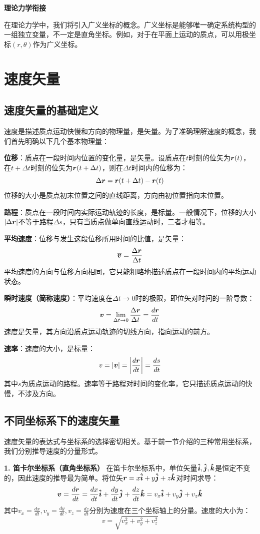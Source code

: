 \textbf{理论力学衔接}

在理论力学中，我们将引入广义坐标的概念。广义坐标是能够唯一确定系统构型的一组独立变量，不一定是直角坐标。例如，对于在平面上运动的质点，可以用极坐标$(r,\theta)$作为广义坐标。

\newpage

\section{速度矢量}

\subsection{速度矢量的基础定义}
速度是描述质点运动快慢和方向的物理量，是矢量。为了准确理解速度的概念，我们首先明确以下几个基本物理量：

\textbf{位移}：质点在一段时间内位置的变化量，是矢量。设质点在$t$时刻的位矢为$\boldsymbol{r}(t)$，在$t+\Delta t$时刻的位矢为$\boldsymbol{r}(t+\Delta t)$，则在$\Delta t$时间内的位移为：
\[
\Delta\boldsymbol{r} = \boldsymbol{r}(t+\Delta t) - \boldsymbol{r}(t)
\]
位移的大小是质点初末位置之间的直线距离，方向由初位置指向末位置。

\textbf{路程}：质点在一段时间内实际运动轨迹的长度，是标量。一般情况下，位移的大小$|\Delta\boldsymbol{r}|$不等于路程$\Delta s$，只有当质点做单向直线运动时，二者才相等。

\textbf{平均速度}：位移与发生这段位移所用时间的比值，是矢量：
\[
\overline{\boldsymbol{v}} = \frac{\Delta\boldsymbol{r}}{\Delta t}
\]
平均速度的方向与位移方向相同，它只能粗略地描述质点在一段时间内的平均运动状态。

\textbf{瞬时速度（简称速度）}：平均速度在$\Delta t \to 0$时的极限，即位矢对时间的一阶导数：
\[
\boldsymbol{v} = \lim_{\Delta t \to 0} \frac{\Delta\boldsymbol{r}}{\Delta t} = \frac{d\boldsymbol{r}}{dt}
\]
速度是矢量，其方向沿质点运动轨迹的切线方向，指向运动的前方。

\textbf{速率}：速度的大小，是标量：
\[
v = |\boldsymbol{v}| = \left| \frac{d\boldsymbol{r}}{dt} \right| = \frac{ds}{dt}
\]
其中$s$为质点运动的路程。速率等于路程对时间的变化率，它只描述质点运动的快慢，不涉及方向。

\subsection{不同坐标系下的速度矢量}
速度矢量的表达式与坐标系的选择密切相关。基于前一节介绍的三种常用坐标系，我们分别推导速度的分量形式。

\textbf{1. 笛卡尔坐标系（直角坐标系）}
在笛卡尔坐标系中，单位矢量$\boldsymbol{\hat{i}},\boldsymbol{\hat{j}},\boldsymbol{\hat{k}}$是恒定不变的，因此速度的推导最为简单。将位矢$\boldsymbol{r}=x\boldsymbol{\hat{i}}+y\boldsymbol{\hat{j}}+z\boldsymbol{\hat{k}}$对时间求导：
\[
\boldsymbol{v} = \frac{d\boldsymbol{r}}{dt} = \frac{dx}{dt}\boldsymbol{\hat{i}} + \frac{dy}{dt}\boldsymbol{\hat{j}} + \frac{dz}{dt}\boldsymbol{\hat{k}} = v_x\boldsymbol{\hat{i}} + v_y\boldsymbol{\hat{j}} + v_z\boldsymbol{\hat{k}}
\]
其中$v_x=\frac{dx}{dt},v_y=\frac{dy}{dt},v_z=\frac{dz}{dt}$分别为速度在三个坐标轴上的分量。速度的大小为：
\[
v = \sqrt{v_x^2 + v_y^2 + v_z^2}
\]

